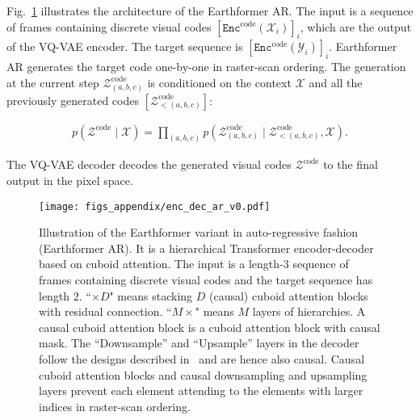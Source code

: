 \documentclass{article}
\newcommand{\figref}[1]{Fig.~\ref{#1}}
\begin{document}
\figref{fig:enc_dec_ar} illustrates the architecture of the Earthformer AR.
The input is a sequence of frames containing discrete visual codes $[\mathtt{Enc}^{\text{code}}(\mathcal{X}_i)]_i$, which are the output of the VQ-VAE encoder.
The target sequence is $[\mathtt{Enc}^{\text{code}}(\mathcal{Y}_i)]_i$. 
Earthformer AR generates the target code one-by-one in raster-scan ordering. 
The generation at the current step $\mathcal{Z}^{\text{code}}_{(a,b,c)}$ is conditioned on the context $\mathcal{X}$ and all the previously generated codes $[\mathcal{Z}^{\text{code}}_{<(a,b,c)}]$: 



\begin{align}
    p(\mathcal{Z}^{\text{code}}\mid\mathcal{X}) = \prod_{(a,b,c)}p\left(\mathcal{Z}^{\text{code}}_{(a,b,c)}\mid\mathcal{Z}^{\text{code}}_{<(a,b,c)}, \mathcal{X}\right).
    \label{eq:raster_scan_conditioning}
\end{align}

The VQ-VAE decoder decodes the generated visual codes $\mathcal{Z}^{\text{code}}$ to the final output in the pixel space.

\begin{figure}[!tb]
    \centering
\texttt{[image: figs\_appendix/enc\_dec\_ar\_v0.pdf]}
    \caption{Illustration of the Earthformer variant in auto-regressive fashion (Earthformer AR). 
    It is a hierarchical Transformer encoder-decoder based on cuboid attention. 
    The input is a length-$3$ sequence of frames containing discrete visual codes and the target sequence has length $2$.
    ``$\times D$" means stacking $D$ (causal) cuboid attention blocks with residual connection. 
    ``$M\times$" means $M$ layers of hierarchies. 
    A causal cuboid attention block is a cuboid attention block with causal mask. 
    The ``Downsample'' and ``Upsample'' layers in the decoder follow the designs described in~\cite{Salimans2017PixeCNN} and are hence also causal.
    Causal cuboid attention blocks and causal downsampling and upsampling layers prevent each element attending to the elements with larger indices in raster-scan ordering.}
    \label{fig:enc_dec_ar}
\end{figure}
\end{document}
